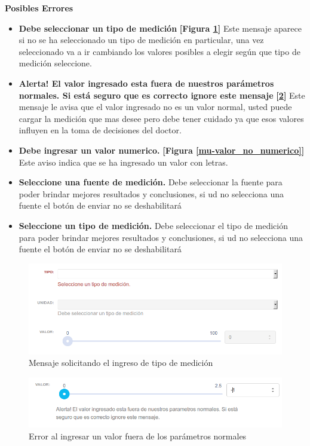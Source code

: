 \begin{itemize}
    
\textbf{Posibles Errores}
\begin{itemize}
	\item \textbf{Debe seleccionar un tipo de medición} \textbf{[Figura \ref{mu-seleccione_tipo}]} Este mensaje aparece si no se ha seleccionado un tipo de medición en particular, una vez seleccionado va a ir cambiando los valores posibles a elegir según que tipo de medición seleccione.
	\item \textbf{Alerta! El valor ingresado esta fuera de nuestros parámetros normales. Si está seguro que es correcto ignore este mensaje} \textbf{[\ref{mu-fuera_de_parametros}]} Este mensaje le avisa que el valor ingresado no es un valor normal, usted puede cargar la medición que mas desee pero debe tener cuidado ya que esos valores influyen en la toma de decisiones del doctor.
	\item \textbf{Debe ingresar un valor numerico.} \textbf{[Figura \ref{mu-valor_no_numerico}]} Este aviso indica que se ha ingresado un valor con letras.
	\item \textbf{Seleccione una fuente de medición.} Debe seleccionar la fuente para poder brindar mejores resultados y conclusiones, si ud no selecciona una fuente el botón de enviar no se deshabilitará
	\item \textbf{Seleccione un tipo de medición.} Debe seleccionar el tipo de medición para poder brindar mejores resultados y conclusiones, si ud no selecciona una fuente el botón de enviar no se deshabilitará
\end{itemize}
\end{itemize}

   \begin{figure}
   	\centering
   	\includegraphics[width=.8\textwidth]{img/manual_de_usuario/seleccione_tipo}
   	\caption{Mensaje solicitando el ingreso de tipo de medición}
   	\label{mu-seleccione_tipo}
   \end{figure}


        \begin{figure}
        	\centering
        	\includegraphics[width=.8\textwidth]{img/manual_de_usuario/fuera_de_parametros}
        	\caption{Error al ingresar un valor fuera de los parámetros normales}
        	\label{mu-fuera_de_parametros}
        \end{figure}
        
